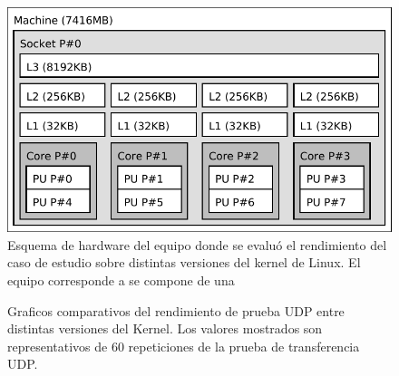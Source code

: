 \begin{figure}[h!]
	\centering
	\includegraphics[scale=0.65]{imagenes/desktopkernelpc.pdf}
	\caption{Esquema de hardware del equipo donde se evaluó el rendimiento del caso de estudio sobre distintas versiones del kernel de Linux. El equipo corresponde a se compone de una }
	\label{fig:desktop_kernel_pc}
\end{figure}


\begin{figure}[h!]
	\centering
	\hspace*{\fill}
	\hfill
	\caption{Graficos comparativos del rendimiento de prueba UDP entre distintas versiones del Kernel. Los valores mostrados son representativos de 60 repeticiones de la prueba de transferencia UDP.}
	\label{fig:tests_kernel}
	\hspace*{\fill}
\end{figure}

